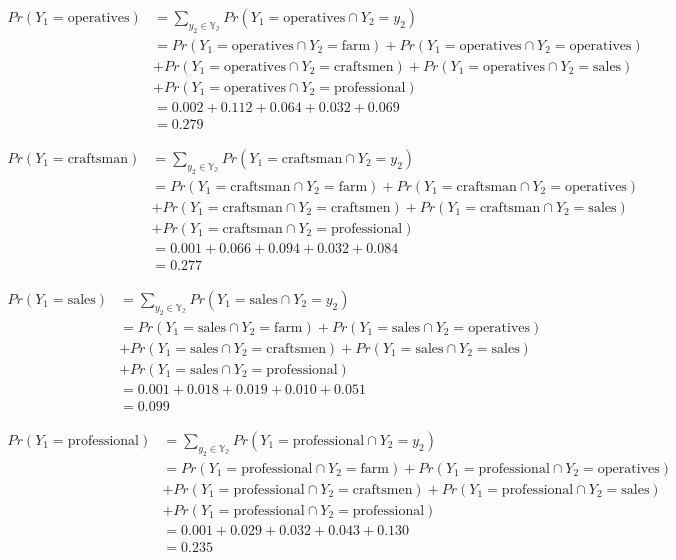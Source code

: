 \documentclass[
  letterpaper,
  DIV=11,
  numbers=noendperiod]{scrreprt}
\begin{document}
\[
\begin{aligned}
    Pr(Y_1 = \text{operatives}) &= \sum_{y_2\in\mathbb{Y_2}}Pr(Y_1= \text{operatives} \cap Y_2=y_2)\\
    &= Pr(Y_1= \text{operatives} \cap Y_2=\text{farm}) + Pr(Y_1= \text{operatives} \cap Y_2=\text{operatives}) \\
    & +Pr(Y_1= \text{operatives} \cap Y_2=\text{craftsmen}) + Pr(Y_1= \text{operatives} \cap Y_2=\text{sales}) \\ 
    & +Pr(Y_1= \text{operatives} \cap Y_2=\text{professional})\\
    &= 0.002 + 0.112 + 0.064 + 0.032 + 0.069\\ 
    &= 0.279
\end{aligned}
\]

\[
\begin{aligned}
    Pr(Y_1 = \text{craftsman}) &= \sum_{y_2\in\mathbb{Y_2}}Pr(Y_1= \text{craftsman} \cap Y_2=y_2)\\
    &= Pr(Y_1= \text{craftsman} \cap Y_2=\text{farm}) + Pr(Y_1= \text{craftsman} \cap Y_2=\text{operatives}) \\
    & +Pr(Y_1= \text{craftsman} \cap Y_2=\text{craftsmen}) + Pr(Y_1= \text{craftsman} \cap Y_2=\text{sales}) \\ 
    & +Pr(Y_1= \text{craftsman} \cap Y_2=\text{professional})\\
    &= 0.001+0.066+0.094+0.032+0.084\\ 
    &= 0.277
\end{aligned}
\]

\[
\begin{aligned}
    Pr(Y_1 = \text{sales}) &= \sum_{y_2\in\mathbb{Y_2}}Pr(Y_1= \text{sales} \cap Y_2=y_2)\\
    &= Pr(Y_1= \text{sales} \cap Y_2=\text{farm}) + Pr(Y_1= \text{sales} \cap Y_2=\text{operatives}) \\
    & +Pr(Y_1= \text{sales} \cap Y_2=\text{craftsmen}) + Pr(Y_1= \text{sales} \cap Y_2=\text{sales}) \\ 
    & +Pr(Y_1= \text{sales} \cap Y_2=\text{professional})\\
    &= 0.001 + 0.018 + 0.019 + 0.010 + 0.051\\ 
    &= 0.099
\end{aligned}
\]

\[
\begin{aligned}
    Pr(Y_1 = \text{professional}) &= \sum_{y_2\in\mathbb{Y_2}}Pr(Y_1= \text{professional} \cap Y_2=y_2)\\
    &= Pr(Y_1= \text{professional} \cap Y_2=\text{farm}) + Pr(Y_1= \text{professional} \cap Y_2=\text{operatives}) \\
    & +Pr(Y_1= \text{professional} \cap Y_2=\text{craftsmen}) + Pr(Y_1= \text{professional} \cap Y_2=\text{sales}) \\ 
    & +Pr(Y_1= \text{professional} \cap Y_2=\text{professional})\\
    &= 0.001 + 0.029 + 0.032 + 0.043 + 0.130\\ 
    &= 0.235
\end{aligned}
\]
\end{document}
